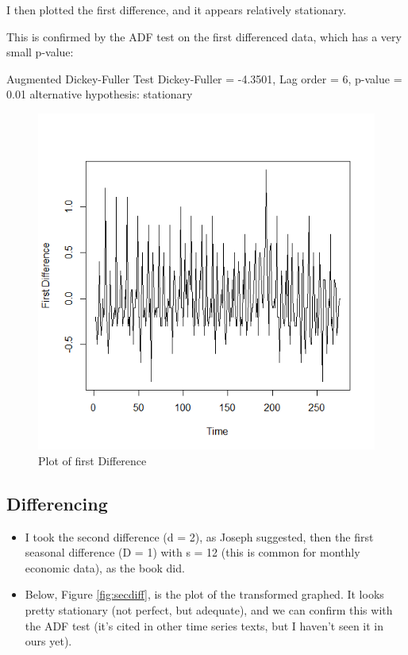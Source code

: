 {			
			\begin{multicols}{2}
						I then plotted the first difference, and it appears relatively stationary.
						
							This is confirmed by the ADF test on the first differenced data, which has a very small p-value:
						
						Augmented Dickey-Fuller Test
						Dickey-Fuller = -4.3501, Lag order = 6, p-value = 0.01
						alternative hypothesis: stationary
						
						\begin{figure}[H]
							\centering
							\includegraphics[width=.6\linewidth]{images/firstdiff}
							\caption{Plot of first Difference}
							\label{fig:firstdiff}
						\end{figure}
			\end{multicols}

	




  \subsection*{Differencing}
  
\begin{itemize}
	\item I took the second difference (d = 2), as Joseph suggested, then the first seasonal difference (D = 1) with s = 12 (this is common for monthly economic data), as the book did.
      
    \item   Below, Figure \ref{fig:secdiff},  is the plot of the transformed graphed. It looks pretty stationary (not perfect, but adequate), and we can confirm this with the ADF test (it's cited in other time series texts, but I haven't seen it in ours yet).
\end{itemize}
      
}
